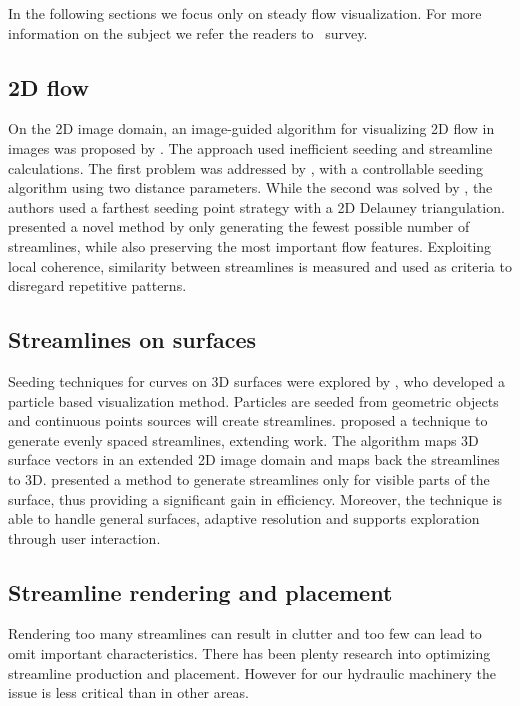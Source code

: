 In the following sections we focus only on steady flow visualization.
For more information on the subject we refer the readers to~\cite{McLoughlin2010} survey.

\subsection{2D flow}

On the 2D image domain, an image-guided algorithm for visualizing 2D flow in images was proposed by \cite{Turk1996}.
The approach used inefficient seeding and streamline calculations.
The first problem was addressed by \cite{Jobard1997}, with a controllable seeding algorithm using two distance parameters.
While the second was solved by \cite{Mebarki2005}, the authors used a farthest seeding point strategy with a 2D Delauney triangulation.
\cite{Li2008} presented a novel method by only generating the fewest possible number of streamlines, while also preserving the most important flow features.
Exploiting local coherence, similarity between streamlines is measured and used as criteria to disregard repetitive patterns.

\subsection{Streamlines on surfaces}

Seeding techniques for curves on 3D surfaces were explored by \cite{VanWijk1992}, who developed a particle based visualization method.
Particles are seeded from geometric objects and continuous points sources will create streamlines.
\cite{Mao1998} proposed a technique to generate evenly spaced streamlines, extending \cite{Turk1996} work.
The algorithm maps 3D surface vectors in an extended 2D image domain and maps back the streamlines to 3D. 
\cite{Spencer2009} presented a method to generate streamlines only for visible parts of the surface, thus providing a significant gain in efficiency.
Moreover, the technique is able to handle general surfaces, adaptive resolution and supports exploration through user interaction.

\subsection{Streamline rendering and placement}

Rendering too many streamlines can result in clutter and too few can lead to omit important characteristics.
There has been plenty research into optimizing streamline production and placement.
However for our hydraulic machinery the issue is less critical than in other areas.

